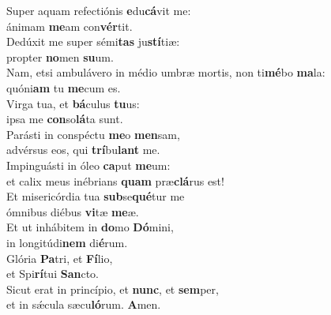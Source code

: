\evenverse Super aquam refectiónis \textbf{e}du\textbf{cá}vit me:~\*\\
\evenverse ánimam \textbf{me}am con\textbf{vér}tit.\\
\oddverse Dedúxit me super sémi\textbf{tas} ju\textbf{stí}tiæ:~\*\\
\oddverse propter \textbf{no}men \textbf{su}um.\\
\evenverse Nam, etsi ambulávero in médio umbræ mortis, non ti\textbf{mé}bo \textbf{ma}la:~\*\\
\evenverse quóni\textbf{am} tu \textbf{me}cum es.\\
\oddverse Virga tua, et \textbf{bá}culus \textbf{tu}us:~\*\\
\oddverse ipsa me \textbf{con}so\textbf{lá}ta sunt.\\
\evenverse Parásti in conspéctu \textbf{me}o \textbf{men}sam,~\*\\
\evenverse advérsus eos, qui \textbf{trí}bu\textbf{lant} me.\\
\oddverse Impinguásti in óleo \textbf{ca}put \textbf{me}um:~\*\\
\oddverse et calix meus inébrians \textbf{quam} præ\textbf{clá}rus est!\\
\evenverse Et misericórdia tua \textbf{sub}se\textbf{qué}tur me~\*\\
\evenverse ómnibus diébus \textbf{vi}tæ \textbf{me}æ.\\
\oddverse Et ut inhábitem in \textbf{do}mo \textbf{Dó}mini,~\*\\
\oddverse in longitúdi\textbf{nem} di\textbf{é}rum.\\
\evenverse Glória \textbf{Pa}tri, et \textbf{Fí}lio,~\*\\
\evenverse et Spi\textbf{rí}tui \textbf{San}cto.\\
\oddverse Sicut erat in princípio, et \textbf{nunc}, et \textbf{sem}per,~\*\\
\oddverse et in sǽcula sæcu\textbf{ló}rum. \textbf{A}men.\\
